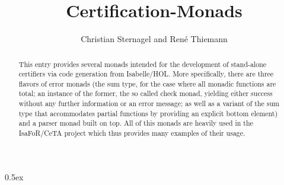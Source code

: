 \documentclass[11pt,a4paper]{article}
\begin{document}
\title{Certification-Monads}
\author{Christian Sternagel and Ren\'e Thiemann}
\maketitle

\begin{abstract}
This entry provides several monads intended for the development of stand-alone
certifiers via code generation from Isabelle/HOL. More specifically, there are
three flavors of error monads (the sum type, for the case where all monadic
functions are total; an instance of the former, the so called check monad,
yielding either success without any further information or an error message; as
well as a variant of the sum type that accommodates partial functions by
providing an explicit bottom element) and a parser monad built on top. All of
this monads are heavily used in the IsaFoR/CeTA project which thus provides many
examples of their usage. 
\end{abstract}

\tableofcontents

\parindent 0pt\parskip 0.5ex



%
%
\end{document}
